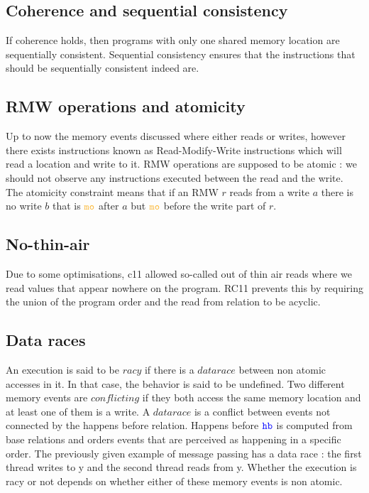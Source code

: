 \documentclass[a4,11pt]{article}
\newcommand{\hb}{\texttt{\color{blue}hb}}
\newcommand{\mo}{\texttt{\color{Dandelion}mo}}
\begin{document}
\subsection{Coherence and sequential consistency}

If coherence holds, then programs with only one shared memory location are sequentially consistent. Sequential consistency ensures that the instructions that should be sequentially consistent indeed are.

\subsection{RMW operations and atomicity}

Up to now the memory events discussed where either reads or writes, however there exists instructions known as Read-Modify-Write instructions which will read a location and write to it. RMW operations are supposed to be atomic : we should not observe any instructions executed between the read and the write. The atomicity constraint means that if an RMW $r$ reads from a write $a$ there is no write $b$ that is $\mo$ after $a$ but $\mo$ before the write part of $r$.

\subsection{No-thin-air}

Due to some optimisations, c11 allowed so-called out of thin air reads where we read values that appear nowhere on the program. RC11 prevents this by requiring the union of the program order and the read from relation to be acyclic.


\subsection{Data races}

An execution is said to be $racy$ if there is a $data race$ between non atomic accesses in it. In that case, the behavior is said to be undefined. Two different memory events are $conflicting$ if they both access the same memory location and at least one of them is a write. A $data race$ is a conflict between events not connected by the happens before relation. Happens before $\hb$ is computed from base relations and orders events that are perceived as happening in a specific order.
The previously given example of message passing has a data race : the first thread writes to y and the second thread reads from y. Whether the execution is racy or not depends on whether either of these memory events is non atomic.
\end{document}
